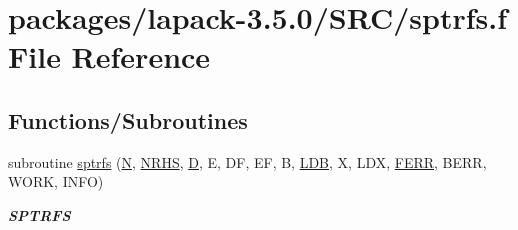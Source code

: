 \hypertarget{sptrfs_8f}{}\section{packages/lapack-\/3.5.0/\+S\+R\+C/sptrfs.f File Reference}
\label{sptrfs_8f}
\subsection*{Functions/\+Subroutines}
\begin{DoxyCompactItemize}
\item 
subroutine \hyperlink{group__realPTcomputational_gabac73ddf5a5f2328168722803d277dd0}{sptrfs} (\hyperlink{polmisc_8c_a0240ac851181b84ac374872dc5434ee4}{N}, \hyperlink{example__user_8c_aa0138da002ce2a90360df2f521eb3198}{N\+R\+H\+S}, \hyperlink{odrpack_8h_a7dae6ea403d00f3687f24a874e67d139}{D}, E, D\+F, E\+F, B, \hyperlink{example__user_8c_a50e90a7104df172b5a89a06c47fcca04}{L\+D\+B}, X, L\+D\+X, \hyperlink{superlu__enum__consts_8h_af00a42ecad444bbda75cde1b64bd7e72a78fd14d7abebae04095cfbe02928f153}{F\+E\+R\+R}, B\+E\+R\+R, W\+O\+R\+K, I\+N\+F\+O)
\begin{DoxyCompactList}\small\item\em {\bfseries S\+P\+T\+R\+F\+S} \end{DoxyCompactList}\end{DoxyCompactItemize}
